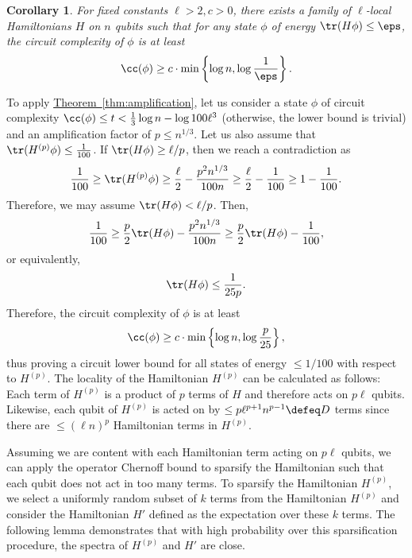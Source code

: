 \documentclass[11pt]{article}
\newcommand{\expref}[2]{\texorpdfstring{\hyperref[#2]{#1~\ref{#2}}}{#1~\ref{#2}}}
\newtheorem{corollary}[theorem]{Corollary}
\begin{document}
\begin{corollary}
For fixed constants $\ell > 2, c > 0$, there exists a family of $\ell$-local Hamiltonians $H$ on $n$ qubits such that for any state $\phi$ of energy $\tr(H\phi) \leq \eps$, the circuit complexity of $\phi$ is at least
\begin{align}
    \cc(\phi) \geq c \cdot \min \left\{ \log n, \log \frac{1}{\eps} \right\}.
\end{align}
\label{cor:reformulation}
\end{corollary}
To apply \expref{Theorem}{thm:amplification}, let us consider a state $\phi$ of circuit complexity $\cc(\phi) \leq t < \frac{1}{3} \log n - \log 100 \ell^3$ (otherwise, the lower bound is trivial) and an amplification factor of $p \leq n^{1/3}$. Let us also assume that $\tr(H^{(p)} \phi) \leq \frac{1}{100}$. If $\tr(H \phi) \geq \ell / p$, then we reach a contradiction as
\begin{align}
    \frac{1}{100} \geq \tr(H^{(p)} \phi) \geq \frac{\ell}{2} - \frac{p^2 n^{1/3}}{100n} \geq \frac{\ell}{2} - \frac{1}{100} \geq 1 - \frac{1}{100}.
\end{align}
Therefore, we may assume $\tr(H \phi) < \ell / p$. Then,
\begin{align}
    \frac{1}{100} \geq \frac{p}{2} \tr(H \phi) - \frac{p^2 n^{1/3}}{100n} \geq \frac{p}{2} \tr(H \phi) - \frac{1}{100},
\end{align}
or equivalently,
\begin{align}
    \tr(H \phi) \leq \frac{1}{25 p}.
\end{align}
Therefore, the circuit complexity of $\phi$ is at least
\begin{align}
    \cc(\phi) \geq c \cdot \min \left\{ \log n, \log \frac{p}{25} \right\},
\end{align}
thus proving a circuit lower bound for all states of energy $\leq 1 / 100$ with respect to $H^{(p)}$. The locality of the Hamiltonian $H^{(p)}$ can be calculated as follows: Each term of $H^{(p)}$ is a product of $p$ terms of $H$ and therefore acts on $p \ell$ qubits. Likewise, each qubit of $H^{(p)}$ is acted on by $\leq p \ell^{p+1} n^{p-1} \defeq D$ terms since there are $\leq (\ell n)^p$ Hamiltonian terms in $H^{(p)}$. 


Assuming we are content with each Hamiltonian term acting on $p \ell$ qubits, we can apply the operator Chernoff bound to sparsify the Hamiltonian such that each qubit does not act in too many terms. To sparsify the Hamiltonian $H^{(p)}$, we select a uniformly random subset of $k$ terms from the Hamiltonian $H^{(p)}$ and consider the Hamiltonian $H'$ defined as the expectation over these $k$ terms. The following lemma demonstrates that with high probability over this sparsification procedure, the spectra of $H^{(p)}$ and $H'$ are close.
\end{document}
